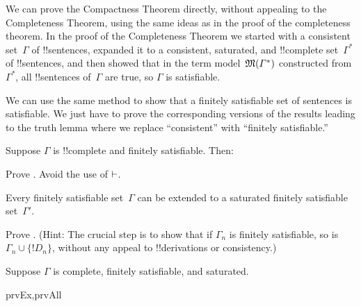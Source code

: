 \documentclass[../../../include/open-logic-section]{subfiles}
\begin{document}

We can prove the Compactness Theorem directly, without appealing to
the Completeness Theorem, using the same ideas as in the proof of the
completeness theorem.  In the proof of the Completeness Theorem we
started with a consistent set~$\Gamma$ of !!{sentence}s, expanded it to a
consistent, saturated, and !!{complete} set~$\Gamma^*$ of
!!{sentence}s, and then showed that in the term
model~$\mathfrak M(\Gamma^*)$ constructed from $\Gamma^*$, all
!!{sentence}s of~$\Gamma$ are true, so $\Gamma$ is satisfiable.

We can use the same method to show that a finitely satisfiable set of
sentences is satisfiable. We just have to prove the corresponding
versions of the results leading to the truth lemma where we replace
``consistent'' with ``finitely satisfiable.''

\begin{prop}
Suppose $\Gamma$ is !!{complete} and finitely satisfiable. Then:
\begin{enumerate}


\end{enumerate}
\end{prop}

\begin{prop}
Prove . Avoid the use of $\Proves$.
\end{prop}

\begin{lem}
 Every finitely satisfiable set~$\Gamma$ can
be extended to a saturated finitely satisfiable set~$\Gamma'$.
\end{lem}

\begin{prob}
Prove . (Hint: The crucial step
is to show that if $\Gamma_n$ is finitely satisfiable, so is $\Gamma_n
\cup \{!D_n\}$, without any appeal to !!{derivation}s or consistency.)
\end{prob}

\begin{prop}
Suppose $\Gamma$ is complete, finitely satisfiable, and saturated.
\begin{tagenumerate}{prvEx,prvAll}
\end{tagenumerate}
\end{prop}
\end{document}
